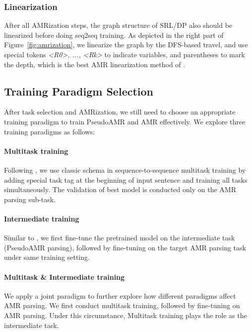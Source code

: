 \documentclass[11pt]{article}
\begin{document}
\subsubsection{Linearization}
After all AMRization steps, the graph structure of SRL/DP also should be linearized before doing seq2seq training.
As depicted in the right part of Figure~\ref{fig:amrization},
we linearize the graph by the DFS-based travel, and use special tokens \textit{<R0>, ..., <Rk>} to indicate variables, and parentheses to mark the depth, which is the best AMR linearization method of \citet{bevil-spring}.

\subsection{Training Paradigm Selection}
\label{sec: training paradigm}
After task selection and AMRization, we still need to choose an appropriate training paradigm to train PseudoAMR and AMR effectively. We explore three training paradigms as follows:
\paragraph{Multitask training}
Following \citet{xu-seqpretrain,Damonte2021OneSP}, we use classic schema in sequence-to-sequence multitask training by adding special task tag at the beginning of input sentence and training all tasks simultaneously. The validation of best model is conducted only on the AMR parsing sub-task.
\paragraph{Intermediate training}
Similar to \citet{kun2020intermediate}, we first fine-tune the pretrained model on the intermediate task (PseudoAMR parsing), followed by fine-tuning on the target AMR parsing task under same training setting. 
\paragraph{Multitask \& Intermediate training} We apply a joint paradigm to further explore how different paradigms affect AMR parsing. We first conduct multitask training, followed by fine-tuning on AMR parsing. Under this circumstance, Multitask training plays the role as the intermediate task.

%
 
\end{document}
